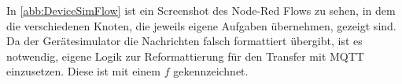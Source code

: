 In \autoref{abb:DeviceSimFlow} ist ein Screenshot des Node-Red Flows zu sehen, in dem die verschiedenen Knoten, die jeweils eigene Aufgaben übernehmen, gezeigt sind. Da der Gerätesimulator die Nachrichten falsch formattiert übergibt, ist es notwendig, eigene Logik zur Reformattierung für den Transfer mit \ac{MQTT} einzusetzen. Diese ist mit einem $f$ gekennzeichnet.


